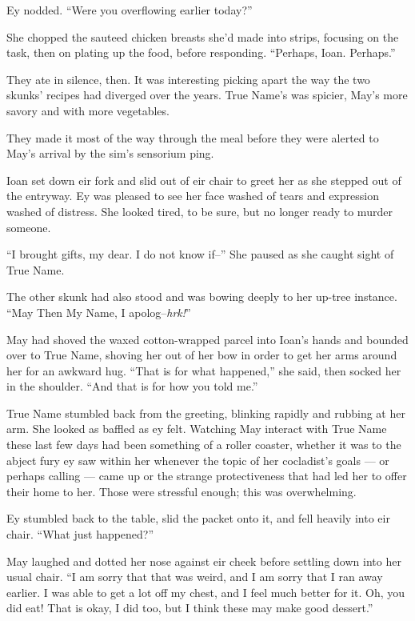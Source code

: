 Ey nodded. ``Were you overflowing earlier today?''

She chopped the sauteed chicken breasts she'd made into strips, focusing on the task, then on plating up the food, before responding. ``Perhaps, Ioan. Perhaps.''

They ate in silence, then. It was interesting picking apart the way the two skunks' recipes had diverged over the years. True Name's was spicier, May's more savory and with more vegetables.

They made it most of the way through the meal before they were alerted to May's arrival by the sim's sensorium ping.

Ioan set down eir fork and slid out of eir chair to greet her as she stepped out of the entryway. Ey was pleased to see her face washed of tears and expression washed of distress. She looked tired, to be sure, but no longer ready to murder someone.

``I brought gifts, my dear. I do not know if--'' She paused as she caught sight of True Name.

The other skunk had also stood and was bowing deeply to her up-tree instance. ``May Then My Name, I apolog--\emph{hrk!}''

May had shoved the waxed cotton-wrapped parcel into Ioan's hands and bounded over to True Name, shoving her out of her bow in order to get her arms around her for an awkward hug. ``That is for what happened,'' she said, then socked her in the shoulder. ``And that is for how you told me.''

True Name stumbled back from the greeting, blinking rapidly and rubbing at her arm. She looked as baffled as ey felt. Watching May interact with True Name these last few days had been something of a roller coaster, whether it was to the abject fury ey saw within her whenever the topic of her cocladist's goals — or perhaps calling — came up or the strange protectiveness that had led her to offer their home to her. Those were stressful enough; this was overwhelming.

Ey stumbled back to the table, slid the packet onto it, and fell heavily into eir chair. ``What just happened?''

May laughed and dotted her nose against eir cheek before settling down into her usual chair. ``I am sorry that that was weird, and I am sorry that I ran away earlier. I was able to get a lot off my chest, and I feel much better for it. Oh, you did eat! That is okay, I did too, but I think these may make good dessert.''


